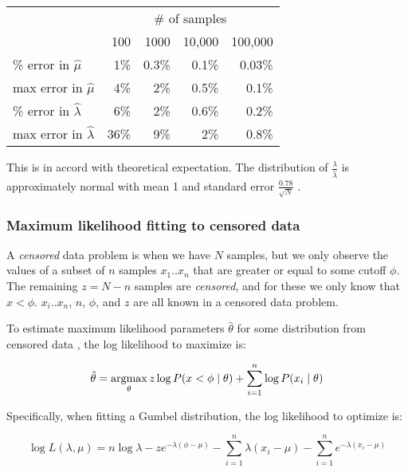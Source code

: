 \begin{center}
\begin{tabular}{lrrrr} \hline
                              & \multicolumn{4}{c}{\# of samples}\\
                              & 100 & 1000  & 10,000 & 100,000 \\
\% error in $\hat{\mu}$       &  1\%& 0.3\% &  0.1\% & 0.03\%  \\
max error in $\hat{\mu}$      &  4\%&   2\% &  0.5\% &  0.1\%  \\
\% error in $\hat{\lambda}$   &  6\%&   2\% &  0.6\% &  0.2\%  \\
max error in $\hat{\lambda}$  & 36\%&   9\% &    2\% &  0.8\%  \\ \hline
\end{tabular}
\end{center}

This is in accord with theoretical expectation. The distribution of
$\frac{\lambda}{\hat{\lambda}}$ is approximately normal with mean 1 and
standard error $\frac{0.78}{\sqrt{N}}$ \citep{Lawless82,Altschul01}. 



\subsubsection{Maximum likelihood fitting to censored data}

A \emph{censored} data problem is when we have $N$ samples, but we
only observe the values of a subset of $n$ samples $x_1..x_n$ that are
greater or equal to some cutoff $\phi$. The remaining $z = N-n$
samples are \emph{censored}, and for these we only know that $x <
\phi$.  $x_i..x_n$, $n$, $\phi$, and $z$ are all known in a censored
data problem.

To estimate maximum likelihood parameters $\hat{\theta}$ for some
distribution from censored data \citep{Gelman95}, the log likelihood
to maximize is:


\[ 
  \hat{\theta} = \mathop{\mathrm{argmax}}\limits_{\theta} z \log P(x<\phi \mid \theta)
                         + \sum_{i=1}^n \log P(x_i \mid \theta)
\]

Specifically, when fitting a Gumbel distribution, the log likelihood
to optimize is:

\begin{equation}
  \log L(\lambda, \mu) = 
    n \log \lambda 
     - z e^{-\lambda(\phi - \mu)}
     - \sum_{i=1}^{n} \lambda(x_i - \mu) 
     - \sum_{i=1}^{n} e^{-\lambda(x_i - \mu)}
\label{eqn:censor_logL}
\end{equation}

